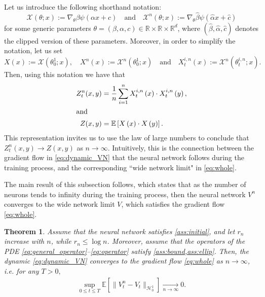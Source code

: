 \documentclass[11pt,a4paper,reqno]{amsart}
\numberwithin{equation}{section}
\theoremstyle{plain}
\newtheorem{theorem}{Theorem}[section]
\theoremstyle{definition}
\def\blue{\color{blue}}
\newcommand{\E}{\mathbb{E}}
\newcommand{\cH}{\mathcal{H}}
\newcommand{\R}{\mathbb{R}}
\begin{document}
Let us introduce the following shorthand notation:
\[
    \mathcal X(\theta; x) := \nabla _\theta \beta \psi \left( \alpha x + c \right)
       \quad  \text{and} \quad
    \mathcal X^n(\theta; x ) := \nabla _\theta \hat\beta \psi \left( \hat\alpha x + \hat c \right)
\]
for some generic parameters $\theta=\left(\beta, \alpha, c\right)\in \R \times \R \times \R^d$, where $(\hat\beta, \hat\alpha, \hat c)$ denotes the clipped version of these parameters. 
Moreover, in order to simplify the notation, let us set 
\[
    X (x):= \mathcal X\left(\theta^1_0;x\right), 
        \quad 
    X^n (x) := \mathcal X^n \left( \theta^1_0;x \right)
        \quad \text{and} \quad 
    X_t^{i,n}(x) := \mathcal X^n \left( \theta^{i,n}_t;x \right). 
\]
Then, using this notation we have that
\begin{align*}
Z_t^n ( x, y ) & = \frac{1}{n} \sum_{i = 1}^n X_t^{i,n}\left(x\right) \cdot X_t^{i,n}\left(y\right), \\
\intertext{and}
Z ( x, y) & = \E \left[ X\left(x\right) \cdot X\left(y\right) \right].
\end{align*}
This representation invites us to use the law of large numbers to conclude that $Z^n_t(x,y)\to Z(x,y)$ as $n\to\infty$.
Intuitively, this is the connection between the gradient flow in \eqref{eq:dynamic_VN} that the neural network follows during the training process, and the corresponding ``wide network limit" in \eqref{eq:whole}.

The main result of this subsection follows, which states that as the number of neurons tends to infinity during the training process, then the neural network $V^n$ converges to the wide network limit $V$, which satisfies the gradient flow \eqref{eq:whole}.

\begin{theorem}
\label{thm:train_NN}
Assume that the neural network satisfies \cref{ass:initial}, and let $r_n$ increase with $n$, while $r_n\le \log n$.
Moreover, assume that the operators of the PDE \eqref{eq:general_operator}--\eqref{eq:operator} satisfy \cref{ass:bound,ass:ellip}.
Then, the dynamic \eqref{eq:dynamic_VN} converges to the gradient flow \eqref{eq:whole} as $n \to \infty$, \emph{i.e.} for any $T>0,$
\begin{align*}
    \sup_{0\le t\le T}\E \left[ \big\| V^n_t - V_t \big\|_{\cH_0^1} \right] \xrightarrow[n\to\infty]{} 0. 
\end{align*}
\end{theorem}
\end{document}
